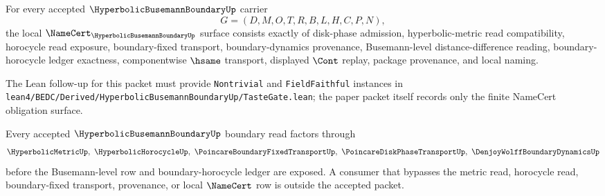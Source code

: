 \begin{theorem}
\label{thm:hyperbolic-busemann-boundary-namecert-obligations}
For every accepted $\HyperbolicBusemannBoundaryUp$ carrier
$$
G=(D,M,O,T,R,B,L,H,C,P,N),
$$
the local $\NameCert_{\HyperbolicBusemannBoundaryUp}$ surface consists exactly of disk-phase admission, hyperbolic-metric read compatibility, horocycle read exposure, boundary-fixed transport, boundary-dynamics provenance, Busemann-level distance-difference reading, boundary-horocycle ledger exactness, componentwise $\hsame$ transport, displayed $\Cont$ replay, package provenance, and local naming.

The Lean follow-up for this packet must provide \texttt{Nontrivial} and \texttt{FieldFaithful} instances in \texttt{lean4/BEDC/Derived/HyperbolicBusemannBoundaryUp/TasteGate.lean}; the paper packet itself records only the finite NameCert obligation surface.
\end{theorem}

\begin{theorem}
\label{thm:hyperbolic-busemann-boundary-horocycle-route}
Every accepted $\HyperbolicBusemannBoundaryUp$ boundary read factors through
$$
\HyperbolicMetricUp,\ \HyperbolicHorocycleUp,\ \PoincareBoundaryFixedTransportUp,\ \PoincareDiskPhaseTransportUp,\ \DenjoyWolffBoundaryDynamicsUp
$$
before the Busemann-level row and boundary-horocycle ledger are exposed. A consumer that bypasses the metric read, horocycle read, boundary-fixed transport, provenance, or local $\NameCert$ row is outside the accepted packet.
\end{theorem}




